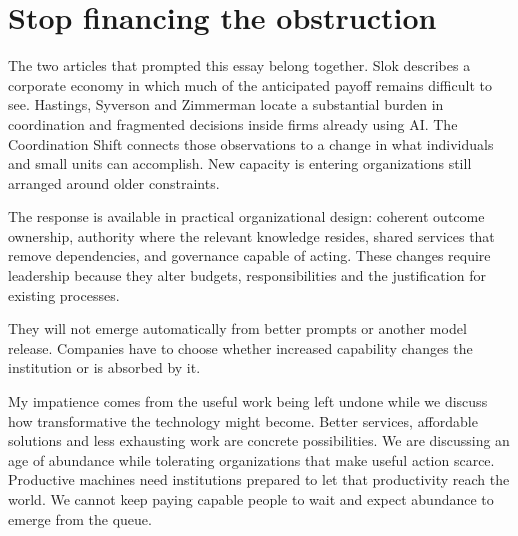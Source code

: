 \SafetyFigure

\clearpage

\section{Stop financing the
obstruction}\label{stop-financing-the-obstruction}


\begin{EssayColumns}\GutterQuote

The two articles that prompted this essay belong together. Slok
describes a corporate economy in which much of the anticipated payoff
remains difficult to see. Hastings, Syverson and Zimmerman locate a
substantial burden in coordination and fragmented decisions inside firms
already using AI. The Coordination Shift connects those observations to
a change in what individuals and small units can accomplish. New
capacity is entering organizations still arranged around older
constraints.

The response is available in practical organizational design: coherent
outcome ownership, authority where the relevant knowledge resides,
shared services that remove dependencies, and governance capable of
acting. These changes require leadership because they alter budgets,
responsibilities and the justification for existing processes.

\NextGutterColumn

They will not emerge automatically from better prompts or another model
release. Companies have to choose whether increased capability changes
the institution or is absorbed by it.

My impatience comes from the useful work being left undone while we
discuss how transformative the technology might become. Better services,
affordable solutions and less exhausting work are concrete
possibilities. We are discussing an age of abundance while tolerating
organizations that make useful action scarce. Productive machines need
institutions prepared to let that productivity reach the world. We
cannot keep paying capable people to wait and expect abundance to emerge
from the queue.

\wrapstuffclear\end{EssayColumns}


